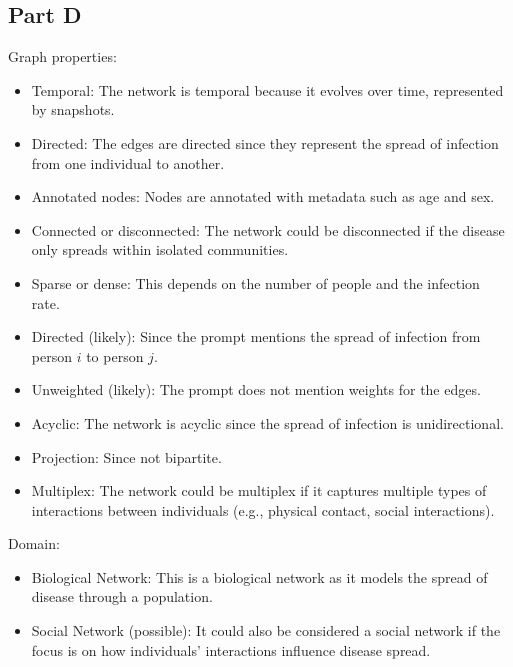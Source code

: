 \documentclass[12pt]{article}
\begin{document}
\subsection*{Part D}
Graph properties:
\begin{itemize}
    \item Temporal: The network is temporal because it evolves over time, represented by snapshots.
    \item Directed: The edges are directed since they represent the spread of infection from one individual to another.
    \item Annotated nodes: Nodes are annotated with metadata such as age and sex.
    \item Connected or disconnected: The network could be disconnected if the disease only spreads within isolated communities.
    \item Sparse or dense: This depends on the number of people and the infection rate.
    \item Directed (likely): Since the prompt mentions the spread of infection from person \(i\) to person \(j\).
    \item Unweighted (likely): The prompt does not mention weights for the edges.
    \item Acyclic: The network is acyclic since the spread of infection is unidirectional.
    \item Projection: Since not bipartite.
    \item Multiplex: The network could be multiplex if it captures multiple types of interactions between individuals (e.g., physical contact, social interactions).
\end{itemize}

\noindent Domain:
\begin{itemize}
    \item Biological Network: This is a biological network as it models the spread of disease through a population.
    \item Social Network (possible): It could also be considered a social network if the focus is on how individuals' interactions influence disease spread.
\end{itemize}
\end{document}
